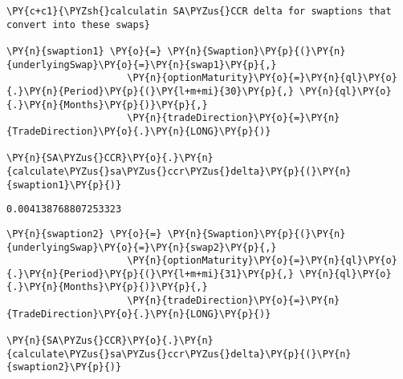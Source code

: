     \begin{tcolorbox}[breakable, size=fbox, boxrule=1pt, pad at break*=1mm,colback=cellbackground, colframe=cellborder]
\begin{Verbatim}[commandchars=\\\{\}]
\PY{c+c1}{\PYZsh{}calculatin SA\PYZus{}CCR delta for swaptions that convert into these swaps}

\PY{n}{swaption1} \PY{o}{=} \PY{n}{Swaption}\PY{p}{(}\PY{n}{underlyingSwap}\PY{o}{=}\PY{n}{swap1}\PY{p}{,}
                     \PY{n}{optionMaturity}\PY{o}{=}\PY{n}{ql}\PY{o}{.}\PY{n}{Period}\PY{p}{(}\PY{l+m+mi}{30}\PY{p}{,} \PY{n}{ql}\PY{o}{.}\PY{n}{Months}\PY{p}{)}\PY{p}{,}
                     \PY{n}{tradeDirection}\PY{o}{=}\PY{n}{TradeDirection}\PY{o}{.}\PY{n}{LONG}\PY{p}{)}

\PY{n}{SA\PYZus{}CCR}\PY{o}{.}\PY{n}{calculate\PYZus{}sa\PYZus{}ccr\PYZus{}delta}\PY{p}{(}\PY{n}{swaption1}\PY{p}{)}
\end{Verbatim}
\end{tcolorbox}

            \begin{tcolorbox}[breakable, size=fbox, boxrule=.5pt, pad at break*=1mm, opacityfill=0]
\begin{Verbatim}[commandchars=\\\{\}]
0.004138768807253323
\end{Verbatim}
\end{tcolorbox}
        
    \begin{tcolorbox}[breakable, size=fbox, boxrule=1pt, pad at break*=1mm,colback=cellbackground, colframe=cellborder]
\begin{Verbatim}[commandchars=\\\{\}]
\PY{n}{swaption2} \PY{o}{=} \PY{n}{Swaption}\PY{p}{(}\PY{n}{underlyingSwap}\PY{o}{=}\PY{n}{swap2}\PY{p}{,}
                     \PY{n}{optionMaturity}\PY{o}{=}\PY{n}{ql}\PY{o}{.}\PY{n}{Period}\PY{p}{(}\PY{l+m+mi}{31}\PY{p}{,} \PY{n}{ql}\PY{o}{.}\PY{n}{Months}\PY{p}{)}\PY{p}{,}
                     \PY{n}{tradeDirection}\PY{o}{=}\PY{n}{TradeDirection}\PY{o}{.}\PY{n}{LONG}\PY{p}{)}

\PY{n}{SA\PYZus{}CCR}\PY{o}{.}\PY{n}{calculate\PYZus{}sa\PYZus{}ccr\PYZus{}delta}\PY{p}{(}\PY{n}{swaption2}\PY{p}{)}
\end{Verbatim}
\end{tcolorbox}

